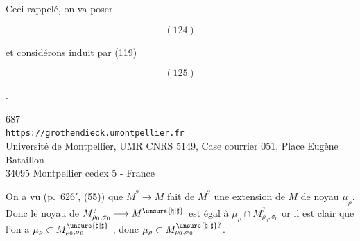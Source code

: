 Ceci rappelé, on va poser
\begin{samepage}
\[
(124)
\]
\end{samepage}
et considérons  induit par (119)
\begin{samepage}
\[
(125)
\]
\end{samepage}
.


\begin{center}
687\\
\texttt{https://grothendieck.umontpellier.fr}\\
Université de Montpellier, UMR CNRS 5149, Case courrier 051, Place Eugène Bataillon\\
34095 Montpellier cedex 5 - France
\end{center}



On a vu (p.\ $626'$, (55)) que $M^?\longrightarrow M$ fait de $M^?$
une extension de $M$ de noyau $\mu_\rho$.
Donc le noyau de $M_{\rho_0,\sigma_0}^?\longrightarrow
M^{\unsure{\natural|\sharp}}$ est égal à
$\mu_\rho\cap M_{\rho_0,\sigma_0}^?$
or il est clair que l'on a
$\mu_\rho\subset M_{\rho_0,\sigma_0}^{\unsure{\natural|\sharp}}$
,
donc $\mu_\rho\subset
M_{\rho_0,\sigma_0}^{\unsure{\natural|\sharp}?}$.

